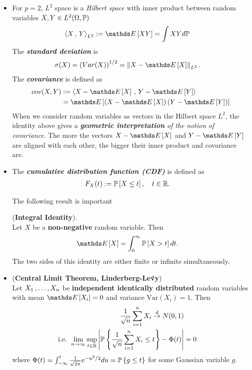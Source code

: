 \documentclass[11pt]{article}
\begin{document}
\begin{itemize}
\item For $p=2$, $L^2$ space is a \emph{Hilbert space} with inner product between random variables $X, Y \in L^2(\Omega, {\mathbb P})$
\begin{align*}
\inn{X}{Y}_{L^2} &:= \E{}{XY} = \int X Y d\bP
\end{align*} The \emph{\textbf{standard deviation}} is 
\begin{align*}
\sigma(X) &= \paren{Var(X) }^{1/2} = \norm{X - \E{}{X}}{L^2}.
\end{align*} The \emph{\textbf{covariance}} is defined as 
\begin{align*}
cov(X, Y) &:= \inn{X- \E{}{X}}{Y - \E{}{Y}} \\
&= \E{}{\paren{X- \E{}{X}}\paren{Y - \E{}{Y}}}
\end{align*} When we consider random variables as vectors in the Hilbert space $L^2$, the identity above gives a \emph{\textbf{geometric interpretation} of the notion of covariance}. The more the vectors $X - \E{}{X}$ and $Y - \E{}{Y}$ are aligned with each other, the bigger their inner product and covariance are.

\item The \emph{\textbf{cumulative distribution function (CDF)}} is defined as
\begin{align*}
F_{X}(t) &:= {\mathbb P}\left[X \le t\right], \quad t\in {\mathbb R}.
\end{align*}

The following result is important 
\begin{lemma} (\textbf{Integral Identity}).  \citep{vershynin2018high}\\
Let $X$ be a \textbf{non-negative} random variable.
Then
\begin{align}
\E{}{X} &= \int_{0}^{\infty}\bP\brac{X > t} dt. \label{eqn: integral_identity}
\end{align}
The two sides of this identity are either finite or infinite simultaneously.
\end{lemma}

\item \begin{theorem} (\textbf{Central Limit Theorem, Linderberg-Le{\'v}y})\\
Let $X_1 \,{,}\ldots{,}\, X_n$ be \textbf{independent identically distributed} random variables with mean $\E{}{X_i} = 0$ and variance $\text{Var}(X_i) = 1$. Then 
\begin{align}
\frac{1}{\sqrt{n}}\sum_{i=1}^{n}X_i  \stackrel{d}{\rightarrow} N(0, 1) \label{eqn: central_limit_theorem} \\
\text{i.e. } \lim\limits_{n \to \infty}\sup_{t \in {\mathbb R}}\left\lvert {\mathbb P}\left\{\frac{1}{\sqrt{n}}\sum_{i=1}^{n}X_i \le t\right\} - \Phi(t) \right\rvert &= 0 \nonumber
\end{align} where $\Phi(t) = \int_{-\infty}^{t}\frac{1}{\sqrt{2\pi}}e^{-u^2/2}du = {\mathbb P}\left\{g \le t\right\}$ for some Gaussian variable $g$.
\end{theorem}


\end{itemize}
\end{document}
